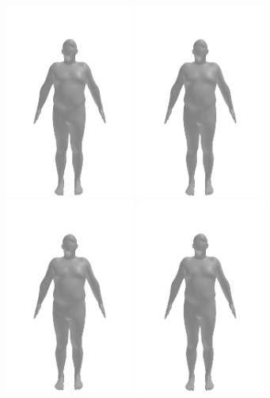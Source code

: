 \begin{figure}[h]
    \centering
    \includegraphics[width=120pt]{files/patients/2_6}
    \includegraphics[width=120pt]{files/patients/2_7}
    \includegraphics[width=120pt]{files/patients/2_8}
    \includegraphics[width=120pt]{files/patients/2_9}

\end{figure}
